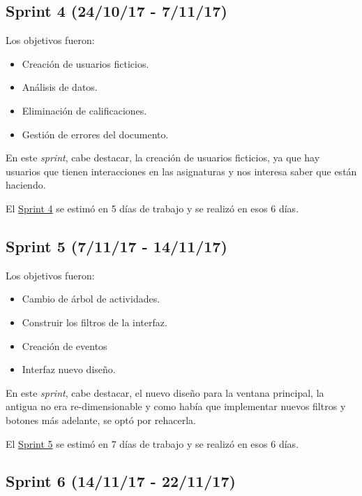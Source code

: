 \newpage
\subsection{Sprint 4 (24/10/17 -
	7/11/17)}\label{sprint-4-241017---071117}

Los objetivos fueron:
\begin{itemize}
	\tightlist
	\item
	Creación de usuarios ficticios.
	\item
	Análisis de datos.
	\item
	Eliminación de calificaciones.	
	\item
	Gestión de errores del documento.
	
\end{itemize}

En este \emph{sprint}, cabe destacar, la creación de usuarios ficticios, ya que hay usuarios que tienen interacciones en las asignaturas y nos interesa saber que están haciendo.

El \href{https://github.com/trona85/GII-17.1B-UBULog-1.0/milestone/4?closed=1}{Sprint 4} se estimó en 5 días de trabajo y se realizó en esos 6 días.

\newpage
\subsection{Sprint 5 (7/11/17 -
	14/11/17)}\label{sprint-5-071117---141117}

Los objetivos fueron:
\begin{itemize}
	\tightlist
	\item
	Cambio de árbol de actividades.
	\item
	Construir los filtros de la interfaz.
	\item
	Creación de eventos	
	\item
	Interfaz nuevo diseño.
	
\end{itemize}

En este \emph{sprint}, cabe destacar, el nuevo diseño para la ventana principal, la antigua no era re-dimensionable y como había que implementar nuevos filtros y botones más adelante, se optó por rehacerla.

El \href{https://github.com/trona85/GII-17.1B-UBULog-1.0/milestone/5?closed=1}{Sprint 5} se estimó en 7 días de trabajo y se realizó en esos 6 días.

\newpage
\subsection{Sprint 6 (14/11/17 -
	22/11/17)}\label{sprint-6-141117---221117}

